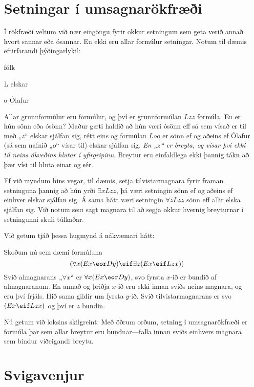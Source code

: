 \section{Setningar í umsagnarökfræði}
Í rökfræði veltum við nær eingöngu fyrir okkur setningum sem geta verið annað hvort sannar eða ósannar. En ekki eru allar formúlur setningar. Notum til dæmis eftirfarandi þýðingarlykil:
	\begin{ekey}
		\item[\text{yfirgrip}] fólk
		\item[L]  elskar 
		\item[o] Ólafur
	\end{ekey}
Allar grunnformúlur eru formúlur, og því er grunnformúlan $Lzz$ formúla. En er hún sönn eða ósönn? Maður gæti haldið að hún væri ósönn eff sá sem vísað er til með „$z$“ elskar sjálfan sig, rétt eins og formúlan $Loo$ er sönn ef og aðeins ef Ólafur (sá sem nafnið „$o$“ vísar til) elskar sjálfan sig. \emph{En „$z$“ er breyta, og vísar því ekki til neins ákveðins hlutar í yfirgripinu}. Breytur eru einfaldlega ekki þannig tákn að þær vísi til hluta einar og sér.
	
Ef við myndum hins vegar, til dæmis, setja tilvistarmagnara fyrir framan setninguna þannig að hún yrði $\exists x L zz$, þá væri setningin sönn ef og aðeins ef einhver elskar sjálfan sig. Á sama hátt væri setningin $\forall z Lzz$ sönn eff allir elska sjálfan sig. Við notum sem sagt magnara til að segja okkur hvernig breyturnar í setningunni skuli túlkaðar.

Við getum tjáð þessa hugmynd á nákvæmari hátt:

Skoðum nú sem dæmi formúluna $$(\forall x(Ex \eor Dy) \eif \exists z(Ex \eif Lzx))$$ Svið almagnarans „$\forall x$“ er 	$\forall x (Ex \eor Dy)$, svo fyrsta $x$-ið er bundið af almagnaranum. En annað og þriðja $x$-ið eru ekki innan sviðs neins magnara, og eru því frjáls. Hið sama gildir um fyrsta $y$-ið.  Svið tilvistarmagnarans er svo $(Ex \eif Lzx)$ og því er $z$ bundin.
		
Nú getum við loksins skilgreint:		
Með öðrum orðum, setning í umsagnarökfræði er formúla þar sem allar breytur eru bundnar---falla innan sviðs einhvers magnara sem bindur viðeigandi breytu.
\section{Svigavenjur}

